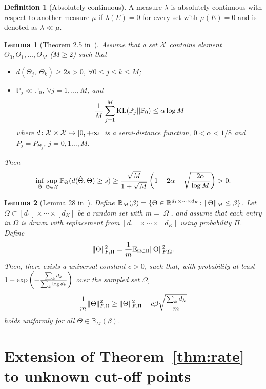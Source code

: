 \documentclass[11pt]{article}
\theoremstyle{plain}
\newtheorem{lem}{Lemma}
\theoremstyle{definition}
\newtheorem{defn}{Definition}
\begin{document}
\begin{defn}[Absolutely continuous]
A measure $\lambda$ is absolutely continuous with respect to another measure $\mu$ if $\lambda(E)=0$ for every set with $\mu(E)=0$ and is denoted as $\lambda\ll\mu$.
\end{defn}


\begin{lem}[Theorem 2.5 in~\cite{tsybakov2009introduction}]\label{lem:Tsybakov}
Assume that a set $\mathcal{X}$ contains element $\Theta_0, \Theta_1, \ldots,\Theta_M$ ($M\geq 2$) such that
\begin{itemize}
\item $d(\Theta_j,\ \Theta_k)\geq 2s>0$, $\forall 0\leq j\leq k\leq M$;
\item $\mathbb{P}_j\ll\mathbb{P}_0$, $\forall j=1,\ldots,M$, and
\[
{1\over M}\sum_{j=1}^M \mathrm{KL}(\mathbb{P}_j||\mathbb{P}_0)\leq \alpha \log M
\]
where $d\colon \mathcal{X}\times \mathcal{X}\mapsto [0,+\infty]$ is a semi-distance function, $0<\alpha<{1/8}$ and $P_j=P_{\Theta_j}$, $j=0,1\ldots,M$.
\end{itemize}
Then
\[
\inf_{\hat \Theta}\sup_{\Theta\in\mathcal{X}} \mathbb{P}_{\Theta}(d(\hat \Theta, \Theta)\geq s)\geq {\sqrt{M}\over 1+\sqrt{M}}\left(1-2\alpha-\sqrt{2\alpha\over \log M} \right)>0.
\]
\end{lem}

\begin{lem}[Lemma 28 in~\cite{ghadermarzy2019near}]\label{lem:convexity}
Define $\mathbb{B}_{M}(\beta)=\{\Theta\in \mathbb{R}^{d_1\times \cdots \times d_K}\colon \lVert\Theta\rVert_M\leq \beta \}$.  Let $\Omega\subset[d_1]\times\cdots \times [d_K]$ be a random set with $m=|\Omega|$, and assume that each entry in $\Omega$ is drawn with replacement from $[d_1]\times\cdots\times[d_K]$ using probability $\Pi$. Define
\[
\lVert\Theta\rVert_{F,\Pi}^2={1\over m}\mathbb{E}_{\Omega\in\Pi}\lVert\Theta\rVert_{F,\Omega}^2.
\]
Then, there exists a universal constant $c>0$, such that, with probability at least $1-\exp\left(-{\sum_kd_k \over \sum_k \log d_k} \right)$ over the sampled set $\Omega$,
\[
{1\over m}\lVert\Theta\rVert_{F,\Omega}^2 \geq \lVert\Theta\rVert_{F,\Pi}^2-c\beta\sqrt{\sum_k d_k\over m}
\]
holds uniformly for all $\Theta\in\mathbb{B}_M(\beta)$.
\end{lem}

\appendix
\section{Extension of Theorem~\ref{thm:rate} to unknown cut-off points}
\end{document}
